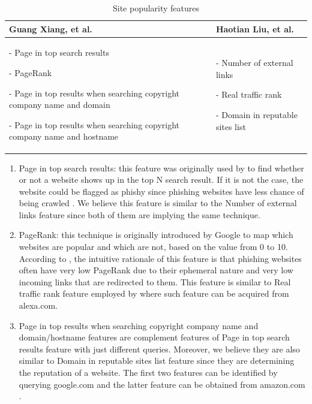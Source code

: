 \begin{table}
\begin{centering}
\begin{tabular}{>{\raggedright}p{5cm}>{\raggedright}p{3.5cm}}
\toprule 
\textbf{\footnotesize{}Guang Xiang, et al. \citep{xiang:2011}} & \textbf{\footnotesize{}Haotian Liu, et al. \citep{liu}}\tabularnewline
\midrule
\midrule 
{\scriptsize{}- Page in top search results }{\scriptsize \par}

{\scriptsize{}- PageRank}{\scriptsize \par}

{\scriptsize{}- Page in top results when searching copyright company
name and domain}{\scriptsize \par}

{\scriptsize{}- Page in top results when searching copyright company
name and hostname } & {\scriptsize{}- Number of external links}{\scriptsize \par}

{\scriptsize{}- Real traffic rank}{\scriptsize \par}

{\scriptsize{}- Domain in reputable sites list}\tabularnewline
\bottomrule
\end{tabular}\protect\caption{\label{tab:popular-features}Site popularity features \citep{xiang:2011,liu}}

\par\end{centering}

\end{table}

\begin{enumerate}
\item Page in top search results: this feature was originally used by \citep{zhang:2007}
to find whether or not a website shows up in the top N search result.
If it is not the case, the website could be flagged as phishy since
phishing websites have less chance of being crawled \citep{xiang:2011}.
We believe this feature is similar to the Number of external links
feature since both of them are implying the same technique.
\item PageRank: this technique is originally introduced by Google to map
which websites are popular and which are not, based on the value from
0 to 10. According to \citep{xiang:2011}, the intuitive rationale
of this feature is that phishing websites often have very low PageRank
due to their ephemeral nature and very low incoming links that are
redirected to them. This feature is similar to Real traffic rank feature
employed by \citep{liu} where such feature can be acquired from alexa.com.
\item Page in top results when searching copyright company name and domain/hostname
features are complement features of Page in top search results feature
with just different queries. Moreover, we believe they are also similar
to Domain in reputable sites list feature since they are determining
the reputation of a website. The first two features can be identified
by querying google.com \citep{xiang:2011} and the latter feature
can be obtained from amazon.com \citep{liu}. 
\end{enumerate}

